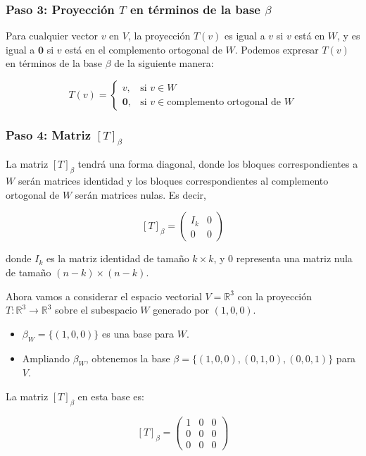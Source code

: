 \subsubsection*{Paso 3: Proyección $T$ en términos de la base $\beta$}

Para cualquier vector $v$ en $V$, la proyección $T(v)$ es igual a $v$ si $v$ está en $W$, y es igual a $\mathbf{0}$ si $v$ está en el complemento ortogonal de $W$. Podemos expresar $T(v)$ en términos de la base $\beta$ de la siguiente manera:

\[
T(v) = \begin{cases} v, & \text{si } v \in W \\ \mathbf{0}, & \text{si } v \in \text{complemento ortogonal de } W \end{cases}
\]

\subsubsection*{Paso 4: Matriz $[T]_{\beta}$}

La matriz $[T]_{\beta}$ tendrá una forma diagonal, donde los bloques correspondientes a $W$ serán matrices identidad y los bloques correspondientes al complemento ortogonal de $W$ serán matrices nulas. Es decir,

\[
[T]_{\beta} = \begin{pmatrix} I_k & 0 \\ 0 & 0 \end{pmatrix}
\]

donde $I_k$ es la matriz identidad de tamaño $k \times k$, y $0$ representa una matriz nula de tamaño $(n - k) \times (n - k)$.

Ahora vamos a considerar el espacio vectorial $V = \mathbb{R}^3$ con la proyección $T: \mathbb{R}^3 \rightarrow \mathbb{R}^3$ sobre el subespacio $W$ generado por $(1, 0, 0)$.

\begin{itemize}
    \item $\beta_W = \{(1, 0, 0)\}$ es una base para $W$.
    \item Ampliando $\beta_W$, obtenemos la base $\beta = \{(1, 0, 0), (0, 1, 0), (0, 0, 1)\}$ para $V$.
\end{itemize}

La matriz $[T]_{\beta}$ en esta base es:

\[
[T]_{\beta} = \begin{pmatrix} 1 & 0 & 0 \\ 0 & 0 & 0 \\ 0 & 0 & 0 \end{pmatrix}
\]

